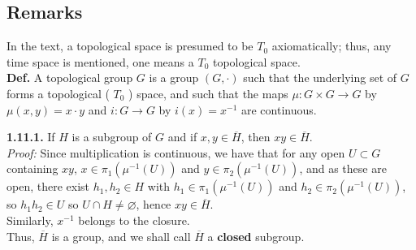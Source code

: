 \documentclass[a4paper]{article}
\theoremstyle{plain}%
\theoremstyle{definition}
\theoremstyle{remark}
\begin{document}
\subsection*{Remarks}
In the text, a topological space is presumed to be $T_0$ axiomatically; thus,
any time space is mentioned, one means a $T_0$ topological space.\\
\linebreak
\textbf{Def.} A topological group $G$ is a group $(G,\cdot )$ such that the
underlying set of $G$ forms a topological ( $T_0$ ) space, and such that the
maps $\mu  \colon G \times G \to G$ by $\mu(x,y) = x\cdot y$ and
$i  \colon G \to G$ by $i(x) = x^{-1}$ are continuous.\\
\linebreak




    \textbf{1.11.1.} If $H$ is a subgroup of $G$ and if $x,y \in \overline{H}$,
    then $xy \in \overline{H}$.\\
    \textit{Proof:} Since multiplication is continuous, we have that
    for any open $U \subset G$ containing $xy$,
    $x \in \pi_1 (\mu^{-1}(U))$ and
    $y \in \pi_2 \left( \mu^{-1}(U) \right) $, and as these are open,
    there exist $h_1,h_2 \in H$ with $h_1 \in \pi_1 \left( \mu^{-1}(U) \right) $ 
    and $h_2 \in \pi_2 \left( \mu^{-1}(U) \right) $, so
    $h_1 h_2 \in U$ so
    $U \cap H \neq \varnothing$, hence
    $xy \in \overline{H}$.\\
    \linebreak
    Similarly, $x^{-1}$ belongs to the closure.\\
    Thus, $\overline{H}$ is a group, and we shall call $\overline{H}$ 
    a \textbf{closed} subgroup.\\
    \linebreak
\end{document}
